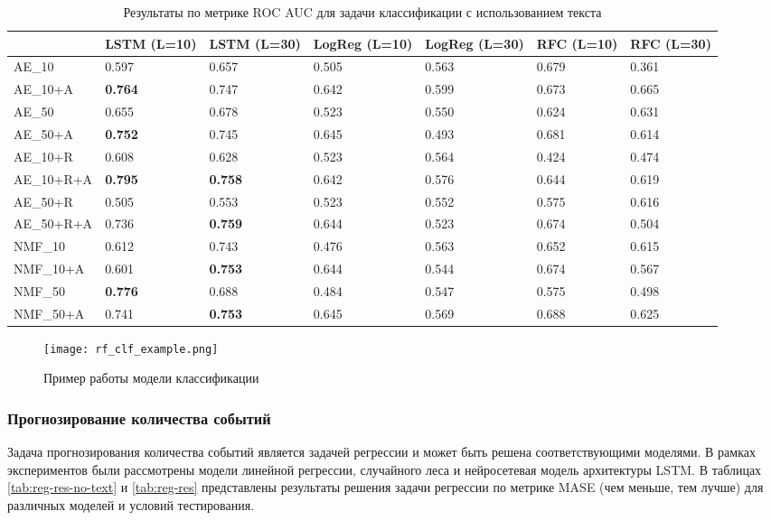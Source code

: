 \begin{center}
\begin{table}
 \begin{tabular}{||p{3.8cm}|p{1.5cm}|p{1.5cm}|p{1.5cm}|p{1.5cm}|p{1.5cm}|p{1.5cm}||} 
\hline
& LSTM (L=10) & LSTM (L=30) & LogReg (L=10) & LogReg (L=30) & RFC (L=10) & RFC (L=30)\\ \hline\hline
AE\_10 & 0.597 & 0.657 & 0.505 & 0.563 & 0.679 & 0.361\\ \hline
AE\_10+A & \textbf{0.764} & 0.747 & 0.642 & 0.599 & 0.673 & 0.665\\ \hline
AE\_50 & 0.655 & 0.678 & 0.523 & 0.550 & 0.624 & 0.631\\ \hline
AE\_50+A & \textbf{0.752} & 0.745 & 0.645 & 0.493 & 0.681 & 0.614\\ \hline
AE\_10+R & 0.608 & 0.628 & 0.523 & 0.564 & 0.424 & 0.474\\ \hline
AE\_10+R+A & \textbf{0.795} & \textbf{0.758} & 0.642 & 0.576 & 0.644 & 0.619\\ \hline
AE\_50+R & 0.505 & 0.553 & 0.523 & 0.552 & 0.575 & 0.616\\ \hline
AE\_50+R+A & 0.736 & \textbf{0.759} & 0.644 & 0.523 & 0.674 & 0.504\\ \hline
NMF\_10 & 0.612 & 0.743 & 0.476 & 0.563 & 0.652 & 0.615\\ \hline
NMF\_10+A & 0.601 & \textbf{0.753} & 0.644 & 0.544 & 0.674 & 0.567\\ \hline
NMF\_50 & \textbf{0.776} & 0.688 & 0.484 & 0.547 & 0.575 & 0.498\\ \hline
NMF\_50+A & 0.741 & \textbf{0.753} & 0.645 & 0.569 & 0.688 & 0.625\\ \hline
 \end{tabular}
 \caption{\label{tab:clf-res-text} Результаты по метрике ROC AUC для задачи классификации с использованием текста}
\end{table}
\end{center}

\begin{figure}
  \texttt{[image: rf\_clf\_example.png]}
  \caption{Пример работы модели классификации}
  \label{fig:rf_clf_example}
\end{figure}

\subsubsection{Прогнозирование количества событий}
Задача прогнозирования количества событий является задачей регрессии и может быть решена соответствующими моделями. В рамках экспериментов были рассмотрены модели линейной регрессии, случайного леса и нейросетевая модель архитектуры LSTM.
В таблицах \ref{tab:reg-res-no-text} и \ref{tab:reg-res} представлены результаты решения задачи регрессии по метрике MASE (чем меньше, тем лучше) для различных моделей и условий тестирования.

